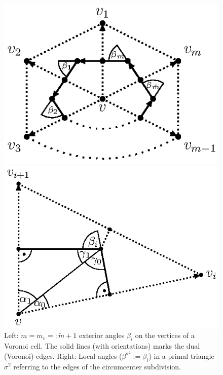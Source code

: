     \begin{figure}
      \begin{minipage}[htp]{.235\textwidth}
        \centering\includegraphics[width=.99\textwidth]{bilder/tikz/GaussBonnet.eps}
      \end{minipage}
      \hfill
      \begin{minipage}[htp]{.235\textwidth}
        \centering\includegraphics[width=.99\textwidth]{bilder/tikz/ElementGaussBonnet.eps}
      \end{minipage}
      \caption{Left: \(  m = m_{v} =: \tilde{m}+1 \) exterior angles \( \beta_{i} \) on the vertices of a Voronoi cell.
                The solid lines (with orientations) marks the dual (Voronoi) edges.
               Right: Local angles (\( \beta^{\sigma^{2}}:=\beta_{i} \)) in a primal triangle \( \sigma^{2} \) referring to the edges of the circumcenter subdivision.}
      \label{figGaussBonnet}
    \end{figure}
